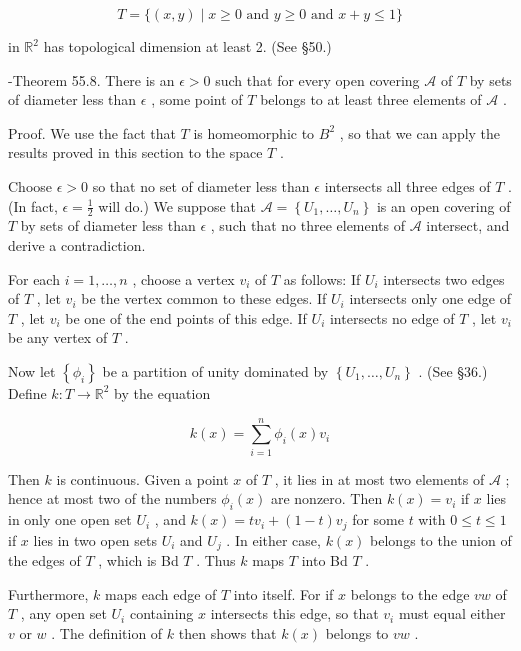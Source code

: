 \documentclass[10pt]{article}
\begin{document}
\[
T = \{ \left( {x,y}\right)  \mid  x \geq  0\text{ and }y \geq  0\text{ and }x + y \leq  1\}
\]

in \({\mathbb{R}}^{2}\) has topological dimension at least 2. (See §50.)

-Theorem 55.8. There is an \(\epsilon  > 0\) such that for every open covering \(\mathcal{A}\) of \(T\) by sets of diameter less than \(\epsilon\) , some point of \(T\) belongs to at least three elements of \(\mathcal{A}\) .

Proof. We use the fact that \(T\) is homeomorphic to \({B}^{2}\) , so that we can apply the results proved in this section to the space \(T\) .

Choose \(\epsilon  > 0\) so that no set of diameter less than \(\epsilon\) intersects all three edges of \(T\) . (In fact, \(\epsilon  = \frac{1}{2}\) will do.) We suppose that \(\mathcal{A} = \left\{  {{U}_{1},\ldots ,{U}_{n}}\right\}\) is an open covering of \(T\) by sets of diameter less than \(\epsilon\) , such that no three elements of \(\mathcal{A}\) intersect, and derive a contradiction.

For each \(i = 1,\ldots ,n\) , choose a vertex \({v}_{i}\) of \(T\) as follows: If \({U}_{i}\) intersects two edges of \(T\) , let \({v}_{i}\) be the vertex common to these edges. If \({U}_{i}\) intersects only one edge of \(T\) , let \({v}_{i}\) be one of the end points of this edge. If \({U}_{i}\) intersects no edge of \(T\) , let \({v}_{i}\) be any vertex of \(T\) .

Now let \(\left\{  {\phi }_{i}\right\}\) be a partition of unity dominated by \(\left\{  {{U}_{1},\ldots ,{U}_{n}}\right\}\) . (See §36.) Define \(k : T \rightarrow  {\mathbb{R}}^{2}\) by the equation

\[
k\left( x\right)  = \mathop{\sum }\limits_{{i = 1}}^{n}{\phi }_{i}\left( x\right) {v}_{i}
\]

Then \(k\) is continuous. Given a point \(x\) of \(T\) , it lies in at most two elements of \(\mathcal{A}\) ; hence at most two of the numbers \({\phi }_{i}\left( x\right)\) are nonzero. Then \(k\left( x\right)  = {v}_{i}\) if \(x\) lies in only one open set \({U}_{i}\) , and \(k\left( x\right)  = t{v}_{i} + \left( {1 - t}\right) {v}_{j}\) for some \(t\) with \(0 \leq  t \leq  1\) if \(x\) lies in two open sets \({U}_{i}\) and \({U}_{j}\) . In either case, \(k\left( x\right)\) belongs to the union of the edges of \(T\) , which is Bd \(T\) . Thus \(k\) maps \(T\) into Bd \(T\) .

Furthermore, \(k\) maps each edge of \(T\) into itself. For if \(x\) belongs to the edge \({vw}\) of \(T\) , any open set \({U}_{i}\) containing \(x\) intersects this edge, so that \({v}_{i}\) must equal either \(v\) or \(w\) . The definition of \(k\) then shows that \(k\left( x\right)\) belongs to \({vw}\) .
\end{document}
